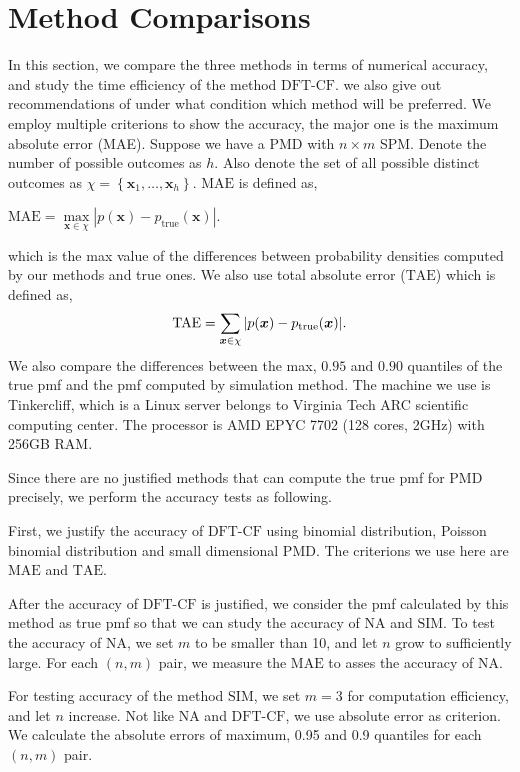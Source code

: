 \documentclass[12pt]{article}
\newcommand{\TAE}{{\textrm{TAE}}}
\newcommand{\MAE}{{\textrm{MAE}}}
\newcommand{\PMD}{\textrm{PMD}}
\newcommand{\xvec}{\boldsymbol{x}}
\newcommand{\SIM}{{\textrm{SIM}}}
\newcommand{\NA}{{\textrm{NA}}}
\newcommand{\dft}{{\textrm{DFT-CF}}}
\begin{document}
\section{Method Comparisons}\label{sec:Method Comparisons}
In this section, we compare the three methods in terms of numerical accuracy, and study the time efficiency of the method $\dft$. we also give out recommendations of under what condition which method will be preferred. We employ multiple criterions to show the accuracy, the major one is the maximum absolute error (MAE). Suppose we have a PMD with $n\times m$ SPM. Denote the number of possible outcomes as $h$. Also denote the set of all possible distinct outcomes as $\chi = \left\{\xvec_1,\dots, \xvec_{h}\right\}$. $\MAE$ is defined as,
\begin{center}
$\mathrm{\MAE} = \underset{\xvec \in \chi}{\max}|p(\xvec) - p_{\text{true}}(\xvec)|$.
\end{center}
which is the max value of the differences between probability densities computed by our methods and true ones.
We also use total absolute error ($\TAE$) which is defined as,
\begin{equation*}
    \mbox{\TAE} = \sum_{\xvec \in \chi} |p(\xvec) - p_{\text{true}}(\xvec)|.
\end{equation*}
We also compare the differences between the max, $0.95$ and $0.90$ quantiles of the true pmf and the pmf computed by simulation method. The machine we use is Tinkercliff, which is a Linux server belongs to Virginia Tech ARC scientific computing center. The processor is AMD EPYC 7702 (128 cores, 2GHz) with 256GB RAM.

Since there are no justified methods that can compute the true pmf for $\PMD$ precisely, we perform the accuracy tests as following.

First, we justify the accuracy of $\dft$ using binomial distribution, Poisson binomial distribution and small dimensional PMD. The criterions we use here are $\MAE$ and $\TAE$.

After the accuracy of $\dft$ is justified, we consider the pmf calculated by this method as true pmf so that we can study the accuracy of $\NA$ and $\SIM$. To test the accuracy of $\NA$, we set $m$ to be smaller than 10, and let $n$ grow to sufficiently large. For each $(n,m)$ pair, we measure the $\MAE$ to asses the accuracy of $\NA$.

For testing accuracy of the method $\SIM$, we set $m=3$ for computation efficiency, and let $n$ increase. Not like $\NA$ and $\dft$, we use absolute error as criterion. We calculate the absolute errors of maximum, 0.95 and 0.9 quantiles for each $(n,m)$ pair.
\end{document}
